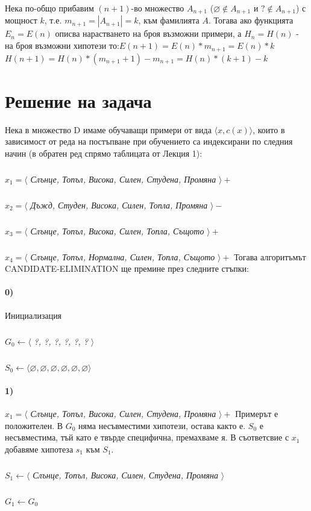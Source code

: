 \documentclass[12pt]{article}
\begin{document}
	Нека по-общо прибавим $(n+1)$-во множество $A_{n+1}$ ($\varnothing \notin A_{n+1}$ и  $? \notin A_{n+1}$)  \newline с мощност $k$, т.е. $m_{n+1} =|A_{n+1}|=k$, към фамилията $A$. \newline\newline 
	Тогава ако функцията $E_{n} = E(n)$ описва нарастването на броя възможни примери, а $H_{n} = H(n)$ - на броя възможни хипотези то:\newline \newline $E(n+1) = E(n)*m_{n+1} = E(n)*k$ \newline $H(n+1) = H(n)*(m_{n+1}+1) - m_{n+1} = H(n)*(k+1) - k$
	
	\newpage
	
	
	\section{Решение на задача }
	
	Нека в множество D имаме обучаващи примери от вида $\langle x, c(x) \rangle$, които в зависимост от реда на постъпване при обучението са индексирани по следния начин (в обратен ред спрямо таблицата от Лекция 1):
		\subparagraph{}
		$x_{1} = \langle $ \textit{Слънце, Топъл, Висока, Силен, Студена, Промяна} $\rangle  +$
		\subparagraph{}
		$x_{2} = \langle $ \textit{Дъжд, Студен, Висока, Силен, Топла, Промяна} $\rangle  -$
		\subparagraph{}
		$x_{3} = \langle $ \textit{Слънце, Топъл, Висока, Силен, Топла, Същото} $\rangle  +$
		\subparagraph{}
		$x_{4} = \langle $ \textit{Слънце, Топъл, Нормална, Силен, Топла, Същото} $\rangle  +$
	\newline\newline
	Тогава алгоритъмът CANDIDATE-ELIMINATION ще премине през следните стъпки:\newline
	
	
	\paragraph{0)} Инициализация
		\subparagraph{}
		$G_{0} \leftarrow \langle $ \textit{?, ?, ?, ?, ?, ?} $\rangle$ 
		\subparagraph{} 
		$S_{0} \leftarrow \langle  \varnothing, \varnothing, \varnothing, \varnothing, \varnothing, \varnothing \rangle$
	
	\paragraph{1)} $x_{1} = \langle $ \textit{Слънце, Топъл, Висока, Силен, Студена, Промяна} $\rangle  +$ \newline\newline
	Примерът е положителен. В $G_{0}$ няма несъвместими хипотези, остава както е. $S_{0}$ е несъвместима, тъй като е твърде специфична, премахваме я. В съответсвие с $x_{1}$ добавяме хипотеза $s_{1}$ към $S_{1}$.
		\subparagraph{}
		$S_{1} \leftarrow \langle $ \textit{Слънце, Топъл, Висока, Силен, Студена, Промяна} $ \rangle$
		\subparagraph{}
		$G_{1} \leftarrow G_{0}$
		
\end{document}
